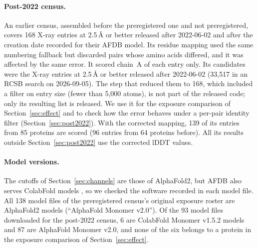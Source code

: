 \documentclass{article}
\begin{document}
\paragraph{Post-2022 census.} An earlier census, assembled before the
preregistered one and not preregistered, covers 168 X-ray entries at
2.5\,\AA{} or better released after 2022-06-02 and after the creation date
recorded for their AFDB model. Its residue mapping used the same numbering
fallback but discarded pairs whose amino acids differed, and it was affected
by the same error. It scored chain~A of each entry only. Its candidates were the X-ray entries at 2.5\,\AA{} or better released after 2022-06-02 (33{,}517 in an RCSB search on 2026-09-05). The step that reduced them to 168, which included a filter on entry size (fewer than 5{,}000 atoms), is not part of the released code; only its resulting list is released. We use it for the exposure comparison of
Section~\ref{sec:effect} and to check how the error behaves under a per-pair
identity filter (Section~\ref{sec:post2022}). With the corrected mapping, 139
of its entries from 85 proteins are scored (96 entries from 64 proteins
before). All its results outside Section~\ref{sec:post2022} use the
corrected lDDT values.

\paragraph{Model versions.} The cutoffs of Section~\ref{sec:channels} are
those of AlphaFold2, but AFDB also serves ColabFold models
\citep{mirdita2022}, so we checked the software recorded in each model file.
All 138 model files of the preregistered census's original exposure roster are AlphaFold2 models
(``AlphaFold Monomer v2.0''). Of the 93 model files downloaded for the
post-2022 census, 6 are ColabFold Monomer v1.5.2 models and 87 are AlphaFold
Monomer v2.0, and none of the six belongs to a protein in the exposure
comparison of Section~\ref{sec:effect}.
\end{document}
